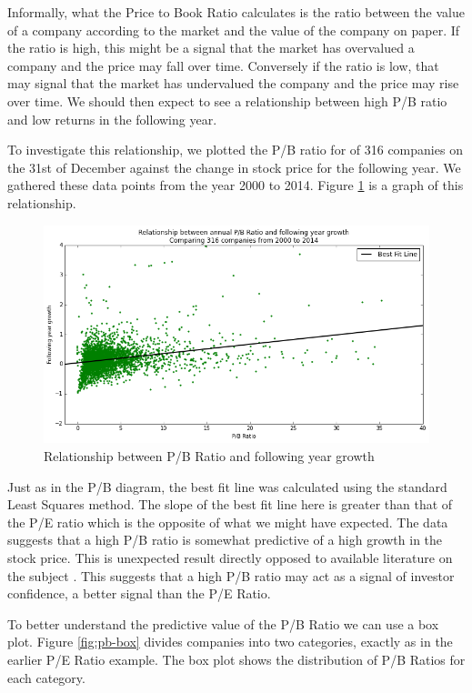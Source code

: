 \documentclass{report}
\begin{document}
Informally, what the Price to Book Ratio calculates is the ratio between the value of a company according to the market and the value of the company on paper. If the ratio is high, this might be a signal that the market has overvalued a company and the price may fall over time. Conversely if the ratio is low, that may signal that the market has undervalued the company and the price may rise over time. We should then expect to see a relationship between high P/B ratio and low returns in the following year. 

To investigate this relationship, we plotted the P/B ratio for of 316 companies on the 31st of December against the change in stock price for the following year. We gathered these data points from the year 2000 to 2014. Figure \ref{fig:pb-abs} is a graph of this relationship.

\begin{figure}[H]
	\caption{Relationship between P/B Ratio and following year growth}
	\centerline{\includegraphics[width=\textwidth]{vis/pb-ratio-abs.png}}
	\label{fig:pb-abs}
\end{figure}

Just as in the P/B diagram, the best fit line was calculated using the standard Least Squares method. The slope of the best fit line here is greater than that of the P/E ratio which is the opposite of what we might have expected. The data suggests that a high P/B ratio is somewhat predictive of a high growth in the stock price. This is unexpected result directly opposed to available literature on the subject \cite{jensen1997new}. This suggests that a high P/B ratio may act as a signal of investor confidence, a better signal than the P/E Ratio. 

To better understand the predictive value of the P/B Ratio we can use a box plot. Figure \ref{fig:pb-box} divides companies into two categories, exactly as in the earlier P/E Ratio example. The box plot shows the distribution of P/B Ratios for each category.
\end{document}
